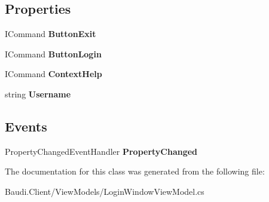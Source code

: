\subsection*{Properties}
\begin{DoxyCompactItemize}
\item 
\hypertarget{class_baudi_1_1_client_1_1_view_models_1_1_login_window_view_model_ad901c84cda9a5b21fa2ffd15e3f498e1}{}I\+Command {\bfseries Button\+Exit}\label{class_baudi_1_1_client_1_1_view_models_1_1_login_window_view_model_ad901c84cda9a5b21fa2ffd15e3f498e1}

\item 
\hypertarget{class_baudi_1_1_client_1_1_view_models_1_1_login_window_view_model_a86fda0cdbc504fe2a4ee13543d269c25}{}I\+Command {\bfseries Button\+Login}\label{class_baudi_1_1_client_1_1_view_models_1_1_login_window_view_model_a86fda0cdbc504fe2a4ee13543d269c25}

\item 
\hypertarget{class_baudi_1_1_client_1_1_view_models_1_1_login_window_view_model_a99e0e13153a041a5e7027e6fcaae50c8}{}I\+Command {\bfseries Context\+Help}\label{class_baudi_1_1_client_1_1_view_models_1_1_login_window_view_model_a99e0e13153a041a5e7027e6fcaae50c8}

\item 
\hypertarget{class_baudi_1_1_client_1_1_view_models_1_1_login_window_view_model_a41094483861187821495f540aef2f572}{}string {\bfseries Username}\label{class_baudi_1_1_client_1_1_view_models_1_1_login_window_view_model_a41094483861187821495f540aef2f572}

\end{DoxyCompactItemize}
\subsection*{Events}
\begin{DoxyCompactItemize}
\item 
\hypertarget{class_baudi_1_1_client_1_1_view_models_1_1_login_window_view_model_a143540a3693e6938ea1b9b78766d0bbb}{}Property\+Changed\+Event\+Handler {\bfseries Property\+Changed}\label{class_baudi_1_1_client_1_1_view_models_1_1_login_window_view_model_a143540a3693e6938ea1b9b78766d0bbb}

\end{DoxyCompactItemize}


The documentation for this class was generated from the following file\+:\begin{DoxyCompactItemize}
\item 
Baudi.\+Client/\+View\+Models/Login\+Window\+View\+Model.\+cs\end{DoxyCompactItemize}
